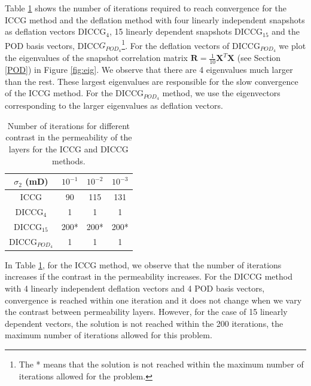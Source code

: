 \documentclass[review]{elsarticle}
\begin{document}
Table \ref{table:he22} shows the number of iterations required to reach convergence for the ICCG method and the deflation method with four linearly independent snapshots as deflation vectors DICCG$_{4}$, 15 linearly dependent snapshots DICCG$_{15}$ and the POD basis vectors, DICC$G_{POD_4}$\footnote{The * means that the solution is not reached within the maximum number of iterations allowed for the problem.}.
For the deflation vectors of DICCG$_{POD_4}$ we plot the eigenvalues of the snapshot correlation matrix $\mathbf{R}=\frac{1}{10}\mathbf{X}^T \mathbf{X}$ (see Section \ref{POD}) in Figure \ref{fig:eig}. We observe that there are 4 eigenvalues much larger than the rest. These largest eigenvalues are responsible for the slow convergence of the ICCG method. For the  DICCG$_{POD_4}$ method, we use the eigenvectors corresponding to the larger eigenvalues as deflation vectors.\\
\renewcommand{\arraystretch}{1}
\begin{table}[!ht]\centering
\begin{minipage}{.7\textwidth}
\vspace{10pt}
\centering
\begin{tabular}{ |c|c|c|c|} 
\hline
 $\sigma_2$ (mD) & $10^{-1}$& $10^{-2}$ & $10^{-3}$ \\
 \hline
  ICCG  & 90& 115&131\\ 
 
  DICCG$_4$  & 1 & 1& 1\\ 
  DICCG$_{15}$  & 200* & 200*& 200*\\
  DICCG$_{POD_4}$  & 1 & 1& 1\\
 \hline
\end{tabular}
\caption{Number of iterations for different contrast in the permeability of the layers
for the ICCG and DICCG methods.}
\label{table:he22}\end{minipage}
\end{table}

In Table \ref{table:he22}, for the ICCG method, we observe that the number of iterations 
increases if the contrast in the permeability increases. For the DICCG method with 4 linearly independent deflation vectors and 4 POD basis vectors, convergence is reached 
within one iteration and it does not change when we vary the contrast between permeability layers. However, for the case of 15 linearly dependent vectors, the solution is not reached within the 200 iterations, the maximum number of iterations allowed for this problem.\\
\end{document}
